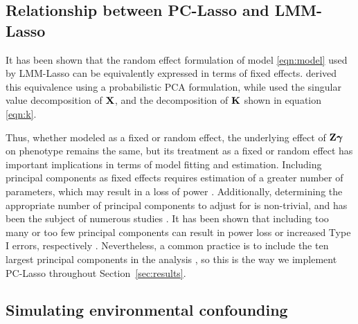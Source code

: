 

\subsection{Relationship between PC-Lasso and LMM-Lasso}

It has been shown that the random effect formulation of model \eqref{eqn:model} used by LMM-Lasso can be equivalently expressed in terms of fixed effects. \citep{zhang2015principal} derived this equivalence using a probabilistic PCA formulation, while \citep{hoffman2013correcting} used the singular value decomposition of $\textbf{X}$, and the decomposition of $\textbf{K}$ shown in equation \eqref{eqn:k}. 

Thus, whether modeled as a fixed or random effect, the underlying effect of $\textbf{Z} \boldsymbol{\gamma}$ on phenotype remains the same, but its treatment as a fixed or random effect has important implications in terms of model fitting and estimation. Including principal components as fixed effects requires estimation of a greater number of parameters, which may result in a loss of power \citep{zhang2015principal}. Additionally, determining the appropriate number of principal components to adjust for is non-trivial, and has been the subject of numerous studies \citep{patterson2006population, zhao2018practical}. It has been shown that including too many or too few principal components can result in power loss or increased Type I errors, respectively \citep{zhang2015principal}. Nevertheless, a common practice is to include the ten largest principal components in the analysis \citep{zhao2018practical}, so this is the way we implement PC-Lasso throughout Section~\ref{sec:results}.



\subsection{Simulating environmental confounding}

